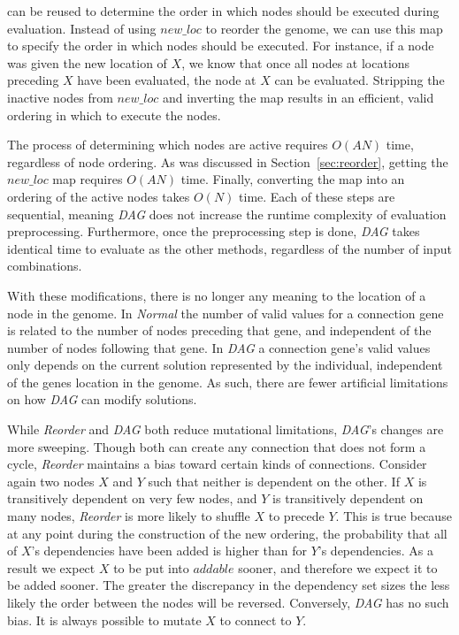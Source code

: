 \documentclass[journal]{IEEEtran}
\begin{document}
 can be reused to determine the order
in which nodes should be executed during evaluation.  Instead of using $new\_loc$
to reorder the genome, we can use this map to specify the order in which nodes should be
executed.  For instance, if a node was given the new location of $X$, we know
that once all nodes at locations preceding $X$ have been evaluated, the node at $X$
can be evaluated.  Stripping the inactive nodes from $new\_loc$ and inverting the map
results in an efficient, valid ordering in which to execute the nodes.

The process of determining which nodes are active requires $O(AN)$ time, regardless
of node ordering.  As was discussed in Section~\ref{sec:reorder},
getting the $new\_loc$ map requires $O(AN)$ time.  Finally, converting the map
into an ordering of the active nodes takes $O(N)$ time.  Each of these steps are
sequential, meaning \emph{DAG} does not increase the runtime complexity of evaluation
preprocessing.  Furthermore, once the preprocessing step is done, \emph{DAG} takes
identical time to evaluate as the other methods, regardless of the number of
input combinations.

With these modifications, there is no longer any meaning to the location of a node
in the genome.  In \emph{Normal} the number of valid
values for a connection gene is related to the number of nodes
preceding that gene, and independent of the number of nodes following that gene.
In \emph{DAG} a connection gene's valid values only depends on the current solution
represented by the individual, independent of the genes location in the genome.
As such, there are fewer artificial limitations on how \emph{DAG} can modify
solutions.

While \emph{Reorder} and \emph{DAG} both reduce mutational limitations, \emph{DAG}'s changes are more sweeping.
Though both can create any connection that does not form a cycle,
\emph{Reorder} maintains a bias toward certain kinds of connections.
Consider again two nodes $X$ and $Y$
such that neither is dependent on the other.  If $X$ is transitively dependent on very
few nodes, and $Y$ is transitively dependent on many nodes, \emph{Reorder} is more likely
to shuffle $X$ to precede $Y$.  This is true because at any point during the construction
of the new ordering, the probability
that all of $X$'s dependencies have been added is
higher than for $Y$'s dependencies.  As a result we expect $X$ to be put into $addable$ sooner,
and therefore we expect it to be added sooner.  The greater the discrepancy in the dependency
set sizes the less likely the order between the nodes will be reversed.
Conversely, \emph{DAG} has no such bias.  It is always possible to mutate $X$ to connect to $Y$.
\end{document}
